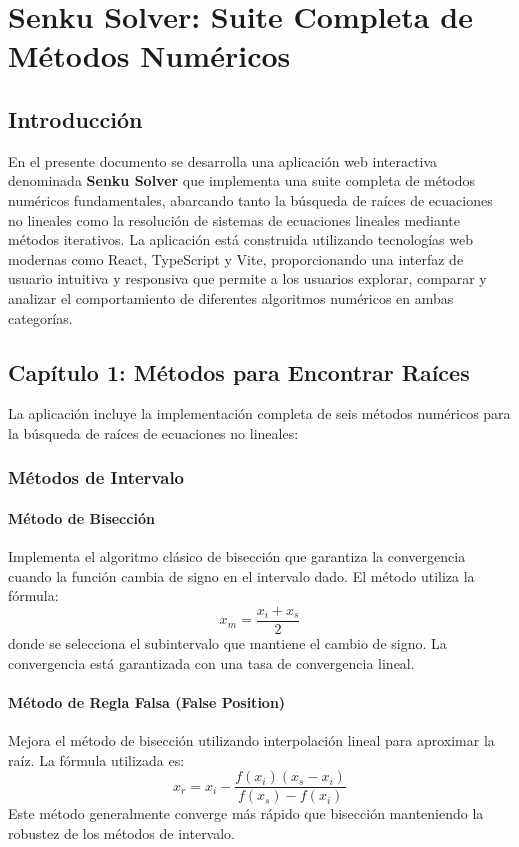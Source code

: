 \chapter{Senku Solver: Suite Completa de Métodos Numéricos}

\section{Introducción}

En el presente documento se desarrolla una aplicación web interactiva denominada \textbf{Senku Solver} que implementa una suite completa de métodos numéricos fundamentales, abarcando tanto la búsqueda de raíces de ecuaciones no lineales como la resolución de sistemas de ecuaciones lineales mediante métodos iterativos. La aplicación está construida utilizando tecnologías web modernas como React, TypeScript y Vite, proporcionando una interfaz de usuario intuitiva y responsiva que permite a los usuarios explorar, comparar y analizar el comportamiento de diferentes algoritmos numéricos en ambas categorías.

\section{Capítulo 1: Métodos para Encontrar Raíces}

La aplicación incluye la implementación completa de seis métodos numéricos para la búsqueda de raíces de ecuaciones no lineales:

\subsection{Métodos de Intervalo}

\subsubsection{Método de Bisección}
Implementa el algoritmo clásico de bisección que garantiza la convergencia cuando la función cambia de signo en el intervalo dado. El método utiliza la fórmula:
\[
x_m = \frac{x_i + x_s}{2}
\]
donde se selecciona el subintervalo que mantiene el cambio de signo. La convergencia está garantizada con una tasa de convergencia lineal.

\subsubsection{Método de Regla Falsa (False Position)}
Mejora el método de bisección utilizando interpolación lineal para aproximar la raíz. La fórmula utilizada es:
\[
x_r = x_i - \frac{f(x_i)(x_s - x_i)}{f(x_s) - f(x_i)}
\]
Este método generalmente converge más rápido que bisección manteniendo la robustez de los métodos de intervalo.

